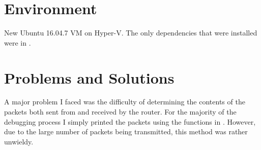 \section{Environment}

New Ubuntu 16.04.7 VM on Hyper-V. The only dependencies that were installed were in .

\section{Problems and Solutions}

A major problem I faced was the difficulty of determining the contents of the packets both sent from and received by the router. For the majority of the debugging process I simply printed the packets using the functions in . However, due to the large number of packets being transmitted, this method was rather unwieldy. 